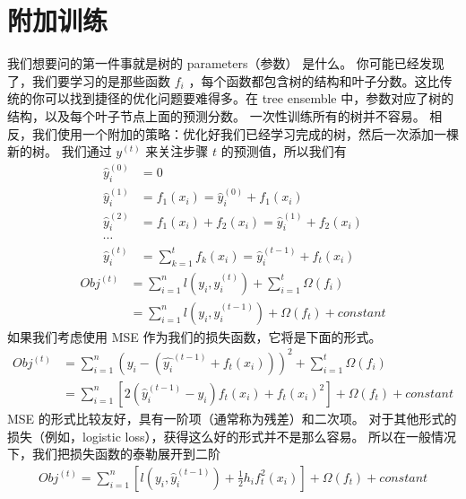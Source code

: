 \documentclass{article}
\begin{document}
\section{附加训练}
我们想要问的第一件事就是树的 parameters（参数） 是什么。 你可能已经发现了，我们要学习的是那些函数 $f_i$ ，每个函数都包含树的结构和叶子分数。这比传统的你可以找到捷径的优化问题要难得多。在 tree ensemble 中，参数对应了树的结构，以及每个叶子节点上面的预测分数。 一次性训练所有的树并不容易。 相反，我们使用一个附加的策略：优化好我们已经学习完成的树，然后一次添加一棵新的树。 我们通过 $y^{(t)}$ 来关注步骤 $t$ 的预测值，所以我们有
\begin{equation*}
	\begin{split}
		\hat{y}_i^{(0)} &= 0\\
		\hat{y}_i^{(1)} &= f_1(x_i)=\hat{y}_i^{(0)}+f_1(x_i)\\
		\hat{y}_i^{(2)} &= f_1(x_i) + f_2(x_i) = \hat{y}_i^{(1)}+f_2(x_i)\\
		\cdots\\
		\hat{y}^{(t)}_i&=\sum_{k=1}^tf_k(x_i)=\hat{y}_i^{(t-1)}+f_t(x_i)
	\end{split}
\end{equation*}
\begin{equation*}
	\begin{split}
		Obj^{(t)}&=\sum_{i=1}^nl(y_i,\hat{y}_i^{(t)})+\sum_{i=1}^t\Omega(f_i)\\
		&=\sum_{i=1}^nl(y_i,\hat{y}_i^{(t-1)})+\Omega(f_t)+constant 
	\end{split}
\end{equation*}
如果我们考虑使用 MSE 作为我们的损失函数，它将是下面的形式。
\begin{equation*}
	\begin{split}
		Obj^{(t)}&=\sum_{i=1}^n(y_i-(\hat{y_i}^{(t-1)}+f_t(x_i)))^2+\sum_{i=1}^t\Omega(f_i)\\
		&=\sum_{i=1}^n[2(\hat{y}^{(t-1)}_i-y_i)f_t(x_i)+f_t(x_i)^2]+\Omega(f_t)+constant 
	\end{split}
\end{equation*}
MSE 的形式比较友好，具有一阶项（通常称为残差）和二次项。 对于其他形式的损失（例如，logistic loss），获得这么好的形式并不是那么容易。 所以在一般情况下，我们把损失函数的泰勒展开到二阶
\begin{equation*}
	\begin{split}
		Obj^{(t)}=\sum_{i=1}^n[l(y_i,\hat{y}_i^{(t-1)})+\frac{1}{2}h_if_t^2(x_i)]+\Omega(f_t)+constant 
	\end{split}
\end{equation*}
\end{document}
